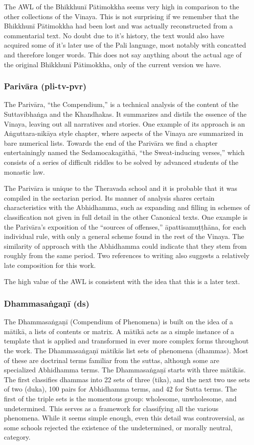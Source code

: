 The AWL of the Bhikkhunī Pātimokkha seems very high in comparison to the other collections of the Vinaya. This is not surprising if we remember that the Bhikkhunī Pātimokkha had been lost and was actually reconstructed from a commentarial text. No doubt due to it's history, the text would also have acquired some of it's later use of the Pali language, most notably with concatted and therefore longer words. This does not say anything about the actual age of the original Bhikkhunī Pātimokkha, only of the current version we have.

\subsubsection{Parivāra (pli-tv-pvr)}
The Parivāra, “the Compendium,” is a technical analysis of the content of the Suttavibhaṅga and the Khandhakas. It summarizes and distils the essence of the Vinaya, leaving out all narratives and stories. One example of its approach is an Aṅguttara-nikāya style chapter, where aspects of the Vinaya are summarized in bare numerical lists. Towards the end of the Parivāra we find a chapter entertainingly named the Sedamocakagāthā, “the Sweat-inducing verses,” which consists of a series of difficult riddles to be solved by advanced students of the monastic law.

The Parivāra is unique to the Theravada school and it is probable that it was compiled in the sectarian period. Its manner of analysis shares certain characteristics with the Abhidhamma, such as expanding and filling in schemes of classification not given in full detail in the other Canonical texts. One example is the Parivāra’s exposition of the “sources of offenses,” āpattisamuṭṭhāna, for each individual rule, with only a general scheme found in the rest of the Vinaya. The similarity of approach with the Abhidhamma could indicate that they stem from roughly from the same period. Two references to writing also suggests a relatively late composition for this work.

The high value of the AWL is consistent with the idea that this is a later text. 

\subsubsection{Dhammasaṅgaṇī (ds)}
The Dhammasaṅgaṇī (Compendium of Phenomena) is built on the idea of a mātikā, a lists of contents or matrix. A mātikā acts as a simple instance of a template that is applied and transformed in ever more complex forms throughout the work. The Dhammasaṅgaṇī mātikās list sets of phenomena (dhammas). Most of these are doctrinal terms familiar from the suttas, although some are specialized Abhidhamma terms. The Dhammasaṅgaṇī starts with three mātikās. The first classifies dhammas into 22 sets of three (tika), and the next two use sets of two (duka), 100 pairs for Abhidhamma terms, and 42 for Sutta terms. The first of the triple sets is the momentous group: wholesome, unwholesome, and undetermined. This serves as a framework for classifying all the various phenomena. While it seems simple enough, even this detail was controversial, as some schools rejected the existence of the undetermined, or morally neutral, category.

